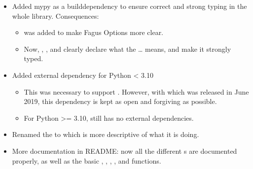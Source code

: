 \documentclass[a4paper,10pt,english]{sphinxmanual}
\begin{document}
\sphinxAtStartPar
{}
\begin{itemize}
\item {}
\sphinxAtStartPar
Added mypy as a build\sphinxhyphen{}dependency to ensure correct and strong typing in the whole library. Consequences:
\begin{itemize}
\item {}
\sphinxAtStartPar
{} was added to make Fagus Options more clear.

\item {}
\sphinxAtStartPar
Now, , ,  and  clearly declare what the … means, and make it strongly typed.

\end{itemize}

\item {}
\sphinxAtStartPar
Added external dependency  for Python \textless{} 3.10
\begin{itemize}
\item {}
\sphinxAtStartPar
This was necessary to support . However, with  which was released in June 2019, this dependency is kept as open and forgiving as possible.

\item {}
\sphinxAtStartPar
For Python \textgreater{}= 3.10,  still has no external dependencies.

\end{itemize}

\item {}
\sphinxAtStartPar
Renamed the   to  which is more descriptive of what it is doing.

\item {}
\sphinxAtStartPar
More documentation in README: now all the different s are documented properly, as well as the basic , , , ,  and \sphinxhyphen{}functions.

\end{itemize}
\end{document}
